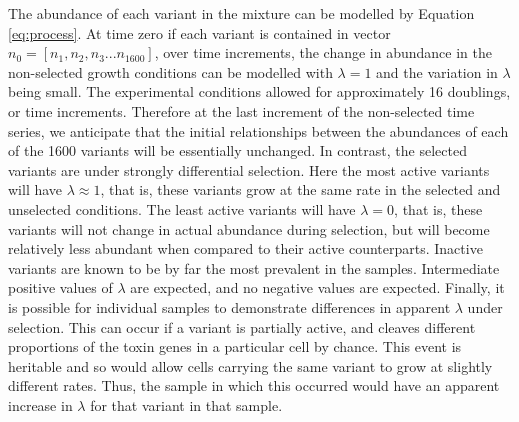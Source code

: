 \documentclass[article]{ajs}\usepackage[]{graphicx}\usepackage[]{color}
\begin{document}
The abundance of each variant in the mixture can be modelled by Equation \ref{eq:process}. At time zero if each variant is contained in vector $n_0=[n_1, n_2, n_3 ... n_{1600}]$, over time increments, the change in abundance in the non-selected growth conditions can be modelled with $\lambda = 1$ and the variation in $\lambda$ being small. The experimental conditions allowed for approximately 16 doublings, or time increments. Therefore at the last increment of the non-selected time series, we anticipate that the initial relationships between the abundances of each of the 1600 variants will be essentially unchanged. In contrast, the selected variants are under strongly differential selection. Here the most active variants will have $\lambda \approx 1$, that is, these variants grow at the same rate in the selected and unselected conditions. The least active variants will have $\lambda = 0$, that is, these variants will not change in actual abundance during selection, but will become relatively less abundant when compared to their active counterparts. Inactive variants are known to be by far the most prevalent in the samples.  Intermediate positive values of $\lambda$ are expected, and no negative values are expected. Finally, it is possible for individual samples to demonstrate differences in apparent $\lambda$ under selection. This can occur if a variant is partially active, and cleaves different proportions of  the toxin genes in a particular cell by chance. This  event is heritable and so would allow  cells carrying the same variant to grow at slightly different rates. Thus, the sample in which this occurred  would have an apparent increase in $\lambda$ for that variant in that sample.
\end{document}
